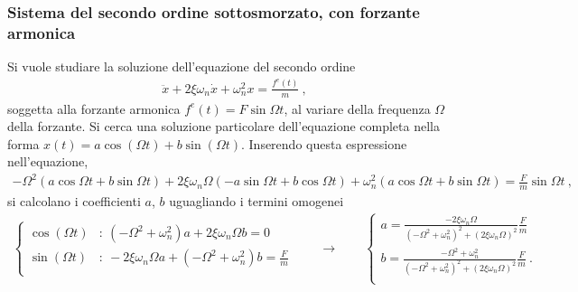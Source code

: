 \documentclass[letterpaper,10pt,italian]{jupyterBook}
\begin{document}
\sphinxAtStartPar
{}

\sphinxAtStartPar
{}
\subsubsection*{Sistema del secondo ordine sotto\sphinxhyphen{}smorzato, con forzante armonica}

\sphinxAtStartPar
Si vuole studiare la soluzione dell’equazione del secondo ordine
\begin{equation*}
\begin{split}\ddot{x} + 2 \xi \omega_n \dot{x} + \omega_n^2 x = \frac{f^e(t)}{m} \ ,\end{split}
\end{equation*}
\sphinxAtStartPar
soggetta alla forzante armonica \(f^e(t) = F \sin \Omega t\), al variare della frequenza \(\Omega\) della forzante. Si cerca una soluzione particolare dell’equazione completa nella forma \(x(t) = a \cos(\Omega t) + b \sin(\Omega t)\). Inserendo questa espressione nell’equazione,
\begin{equation*}
\begin{split}-\Omega^2 ( a \cos \Omega t + b \sin \Omega t) + 2 \xi \omega_n \Omega ( -a \sin \Omega t + b \cos \Omega t) + \omega_n^2 (a \cos \Omega t + b \sin \Omega t) = \frac{F}{m} \sin \Omega t \ ,\end{split}
\end{equation*}
\sphinxAtStartPar
si calcolano i coefficienti \(a\), \(b\) uguagliando i termini omogenei
\begin{equation*}
\begin{split}\begin{cases}
\cos (\Omega t) & : \  (-\Omega^2 + \omega_n^2) a + 2 \xi \omega_n \Omega b = 0 \\
\sin (\Omega t) & : \ -2 \xi \omega_n \Omega a + (-\Omega^2 + \omega_n^2) b = \frac{F}{m} \\
\end{cases}
\qquad \rightarrow \qquad
\begin{cases}
 a = \frac{- 2 \xi \omega_n \Omega}{(-\Omega^2 + \omega_n^2)^2 + (2\xi \omega_n \Omega)^2} \frac{F}{m} \\
 b = \frac{-\Omega^2 + \omega_n^2}{(-\Omega^2 + \omega_n^2)^2 + (2\xi \omega_n \Omega)^2} \frac{F}{m} \ .\\
\end{cases} 
\end{split}
\end{equation*}
\end{document}

